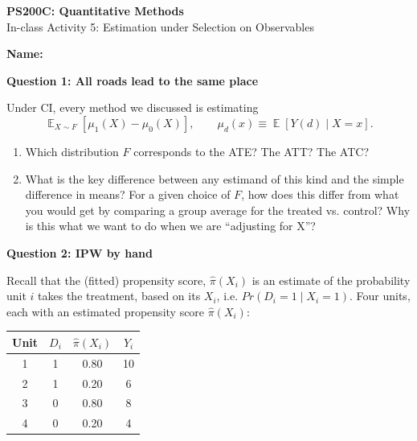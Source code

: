 \documentclass[11pt]{article}
\DeclareMathOperator{\E}{\mathbb{E}}
\begin{document}
\begin{center}
{\Large \textbf{PS200C: Quantitative Methods}} \\[6pt]
{\large In-class Activity 5: Estimation under Selection on Observables}
\end{center}

\vspace{4pt}
\noindent\textbf{Name:} \hrulefill

\vspace{12pt}

\noindent\textbf{Question 1: All roads lead to the same place}

\medskip
\noindent Under CI, every method we discussed is estimating
$$\E_{X \sim F}\!\left[\mu_1(X) - \mu_0(X)\right], \qquad \mu_d(x) \equiv \E[Y(d) \mid X = x].$$

\begin{enumerate}[label=(\alph*)]
\item Which distribution $F$ corresponds to the ATE? The ATT? The ATC?

\vspace{2.2cm}

\item What is the key difference between any estimand of this kind and the simple difference in means? For a given choice of $F$, how does this differ from what you would get by comparing a group average for the treated vs. control? Why is this what we want to do when we are ``adjusting for X''?


\vspace{2cm}
\end{enumerate}


\noindent\textbf{Question 2: IPW by hand}

\medskip
\noindent Recall that the (fitted) propensity score, $\hat{\pi}(X_i)$ is an estimate of the probability unit $i$ takes the treatment, based on its $X_i$, i.e. $Pr(D_i=1 \mid X_i=1)$. Four units, each with an estimated propensity score $\widehat{\pi}(X_i)$:

\begin{center}
\begin{tabular}{@{} c c c c @{}}
\toprule
Unit & $D_i$ & $\widehat{\pi}(X_i)$ & $Y_i$ \\
\midrule
1 & 1 & 0.80 & 10 \\
2 & 1 & 0.20 & \phantom{0}6 \\
3 & 0 & 0.80 & \phantom{0}8 \\
4 & 0 & 0.20 & \phantom{0}4 \\
\bottomrule
\end{tabular}
\end{center}
\end{document}
